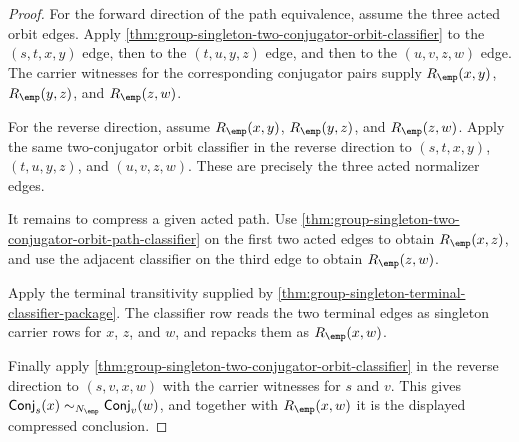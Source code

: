 \begin{proof}
For the forward direction of the path equivalence, assume the three acted orbit
edges. Apply
\autoref{thm:group-singleton-two-conjugator-orbit-classifier} to the
$(s,t,x,y)$ edge, then to the $(t,u,y,z)$ edge, and then to the $(u,v,z,w)$
edge. The carrier witnesses for the corresponding conjugator pairs supply
$R_{\emp}(x,y)$, $R_{\emp}(y,z)$, and $R_{\emp}(z,w)$.

For the reverse direction, assume $R_{\emp}(x,y)$, $R_{\emp}(y,z)$, and
$R_{\emp}(z,w)$. Apply the same two-conjugator orbit classifier in the reverse
direction to $(s,t,x,y)$, $(t,u,y,z)$, and $(u,v,z,w)$. These are precisely the
three acted normalizer edges.

It remains to compress a given acted path. Use
\autoref{thm:group-singleton-two-conjugator-orbit-path-classifier} on the first
two acted edges to obtain $R_{\emp}(x,z)$, and use the adjacent classifier on
the third edge to obtain $R_{\emp}(z,w)$.

Apply the terminal transitivity supplied by
\autoref{thm:group-singleton-terminal-classifier-package}. The classifier row
reads the two terminal edges as singleton carrier rows for $x$, $z$, and $w$,
and repacks them as $R_{\emp}(x,w)$.

Finally apply
\autoref{thm:group-singleton-two-conjugator-orbit-classifier} in the reverse
direction to $(s,v,x,w)$ with the carrier witnesses for $s$ and $v$. This gives
$\mathsf{Conj}_s(x)\sim_{N_{\emp}}\mathsf{Conj}_v(w)$, and together with
$R_{\emp}(x,w)$ it is the displayed compressed conclusion.
\end{proof}

